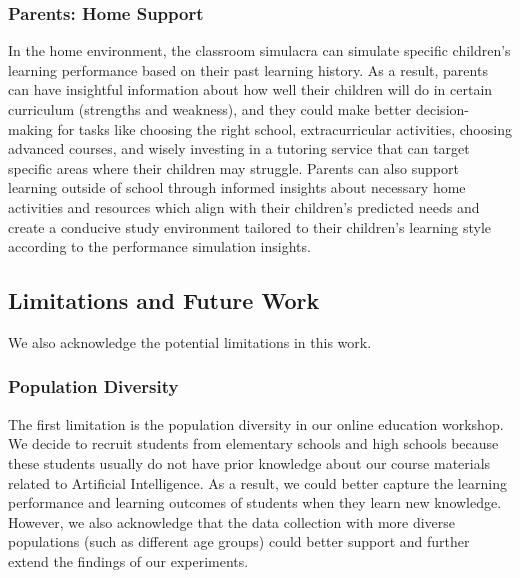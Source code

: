 \subsubsection{Parents: Home Support}
In the home environment, the classroom simulacra can simulate specific children's learning performance based on their past learning history. As a result, parents can have insightful information about how well their children will do in certain curriculum (strengths and weakness), and they could make better decision-making for tasks like choosing the right school, extracurricular activities, choosing advanced courses, and wisely investing in a tutoring service that can target specific areas where their children may struggle. Parents can also support learning outside of school through informed insights about necessary home activities and resources which align with their children's predicted needs and create a conducive study environment tailored to their children’s learning style according to the  performance simulation insights.  



\subsection{Limitations and Future Work}
We also acknowledge the potential limitations in this work.

\subsubsection{Population Diversity}
The first limitation is the population diversity in our online education workshop. We decide to recruit students from elementary schools and high schools because these students usually do not have prior knowledge about our course materials related to Artificial Intelligence. As a result, we could better capture the learning performance and learning outcomes of students when they learn new knowledge. However, we also acknowledge that the data collection with more diverse populations (such as different age groups) could better support and further extend the findings of our experiments.

